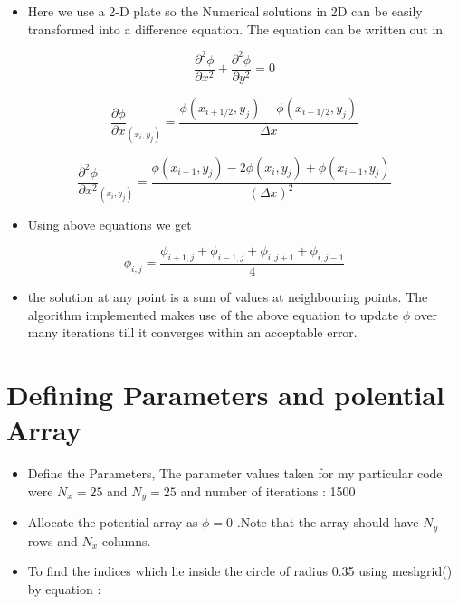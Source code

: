 \documentclass[11pt, a4paper]{article}
\begin{document}
    
    \begin{itemize}
    \item
      Here we use a 2-D plate so the Numerical solutions in 2D can be easily
      transformed into a difference equation. The equation can be written
      out in
    \end{itemize}
    
    \begin{equation}
    \frac{\partial^{2} \phi}{\partial x^{2}}+ \frac{\partial^{2} \phi}{\partial y^{2}} = 0
     \end{equation}
    
    \begin{equation}
    \frac{\partial \phi}{\partial x}_{(x_i,y_j)} = \frac{\phi(x_{i+1/2},y_j) - \phi(x_{i-1/2},y_j)}{\Delta x}
     \end{equation}
    
    \begin{equation}
    \frac{\partial^{2} \phi}{\partial x^{2}}_{(x_i,y_j)} = \frac{\phi(x_{i+1},y_j) -2\phi(x_i,y_j)+ \phi(x_{i-1},y_j)}{(\Delta x)^{2}}
     \end{equation}
    
    \begin{itemize}
    \item
      Using above equations we get
    \end{itemize}
    
    \begin{equation}
            \phi_{i,j} = \frac{\phi_{i+1,j} + \phi_{i-1,j} + \phi_{i,j+1} + \phi_{i,j-1}}{4} 
    \end{equation}
    
    \begin{itemize}
    \item
     the solution at any point is a sum of values at neighbouring points.  The algorithm implemented makes use of the above equation to update $\phi$ over many iterations till it converges within an acceptable error.
  \end{itemize}

  \section{Defining Parameters and polential Array}
  

\begin{itemize}
\item
  Define the Parameters, The parameter values taken for my particular code were \(N_x = 25\) and \(N_y = 25\) and number of iterations : 1500
\item
  Allocate the potential array as \(\phi = 0\) .Note that the array
  should have \(N_y\) rows and \(N_x\) columns.
\item
  To find the indices which lie inside the circle of radius 0.35 using
  meshgrid() by equation :
\end{itemize}
\end{document}
